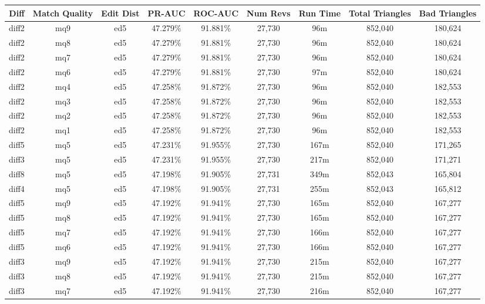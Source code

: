 \begin{landscape}
  \begin{longtable}{|c|c|c||c|c||c|c|c|c|}
\hline
Diff & Match Quality & Edit Dist
        & PR-AUC & ROC-AUC
        & Num Revs & Run Time
        & Total Triangles & Bad Triangles \\
\hline
\hline
\endhead
\hline
\endfoot
diff2 & mq9 & ed5 & 47.279\% & 91.881\% & 27,730 & 96m & 852,040 & 180,624 \\
diff2 & mq8 & ed5 & 47.279\% & 91.881\% & 27,730 & 96m & 852,040 & 180,624 \\
diff2 & mq7 & ed5 & 47.279\% & 91.881\% & 27,730 & 96m & 852,040 & 180,624 \\
diff2 & mq6 & ed5 & 47.279\% & 91.881\% & 27,730 & 97m & 852,040 & 180,624 \\
diff2 & mq4 & ed5 & 47.258\% & 91.872\% & 27,730 & 96m & 852,040 & 182,553 \\
diff2 & mq3 & ed5 & 47.258\% & 91.872\% & 27,730 & 96m & 852,040 & 182,553 \\
diff2 & mq2 & ed5 & 47.258\% & 91.872\% & 27,730 & 96m & 852,040 & 182,553 \\
diff2 & mq1 & ed5 & 47.258\% & 91.872\% & 27,730 & 96m & 852,040 & 182,553 \\
diff5 & mq5 & ed5 & 47.231\% & 91.955\% & 27,730 & 167m & 852,040 & 171,265 \\
diff3 & mq5 & ed5 & 47.231\% & 91.955\% & 27,730 & 217m & 852,040 & 171,271 \\
diff8 & mq5 & ed5 & 47.198\% & 91.905\% & 27,731 & 349m & 852,043 & 165,804 \\
diff4 & mq5 & ed5 & 47.198\% & 91.905\% & 27,731 & 255m & 852,043 & 165,812 \\
diff5 & mq9 & ed5 & 47.192\% & 91.941\% & 27,730 & 165m & 852,040 & 167,277 \\
diff5 & mq8 & ed5 & 47.192\% & 91.941\% & 27,730 & 165m & 852,040 & 167,277 \\
diff5 & mq7 & ed5 & 47.192\% & 91.941\% & 27,730 & 166m & 852,040 & 167,277 \\
diff5 & mq6 & ed5 & 47.192\% & 91.941\% & 27,730 & 166m & 852,040 & 167,277 \\
diff3 & mq9 & ed5 & 47.192\% & 91.941\% & 27,730 & 215m & 852,040 & 167,277 \\
diff3 & mq8 & ed5 & 47.192\% & 91.941\% & 27,730 & 215m & 852,040 & 167,277 \\
diff3 & mq7 & ed5 & 47.192\% & 91.941\% & 27,730 & 216m & 852,040 & 167,277 \\

\end{longtable}
\end{landscape}
